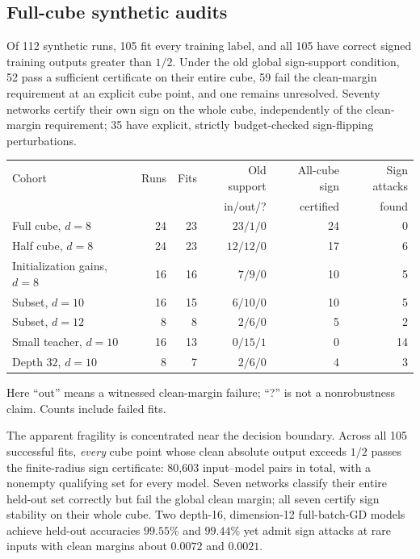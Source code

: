 \subsection{Full-cube synthetic audits}

Of 112 synthetic runs, 105 fit every training label, and all 105 have
correct signed training outputs greater than $1/2$. Under the old global
sign-support condition, 52 pass a sufficient certificate on their entire
cube, 59 fail the clean-margin requirement at an explicit cube point,
and one remains unresolved. Seventy networks certify their own sign on
the whole cube, independently of the clean-margin requirement; 35 have
explicit, strictly budget-checked sign-flipping perturbations.

\begin{center}
\begin{tabular}{lrrrrr}
\toprule
Cohort & Runs & Fits & Old support & All-cube sign & Sign attacks\\
 & & & in/out/? & certified & found\\
\midrule
Full cube, $d=8$ & 24 & 23 & $23/1/0$ & 24 & 0\\
Half cube, $d=8$ & 24 & 23 & $12/12/0$ & 17 & 6\\
Initialization gains, $d=8$ & 16 & 16 & $7/9/0$ & 10 & 5\\
Subset, $d=10$ & 16 & 15 & $6/10/0$ & 10 & 5\\
Subset, $d=12$ & 8 & 8 & $2/6/0$ & 5 & 2\\
Small teacher, $d=10$ & 16 & 13 & $0/15/1$ & 0 & 14\\
Depth $32$, $d=10$ & 8 & 7 & $2/6/0$ & 4 & 3\\
\bottomrule
\end{tabular}
\end{center}
Here ``out'' means a witnessed clean-margin failure; ``?'' is not a
nonrobustness claim. Counts include failed fits.

The apparent fragility is concentrated near the decision boundary.
Across all 105 successful fits, \emph{every} cube point whose clean
absolute output exceeds $1/2$ passes the finite-radius sign certificate:
80,603 input--model pairs in total, with a nonempty qualifying set for
every model. Seven networks classify their entire held-out set correctly
but fail the global clean margin; all seven certify sign stability on
their whole cube. Two depth-16, dimension-12 full-batch-GD models achieve
held-out accuracies $99.55\%$ and $99.44\%$ yet admit sign attacks at rare
inputs with clean margins about $0.0072$ and $0.0021$.

